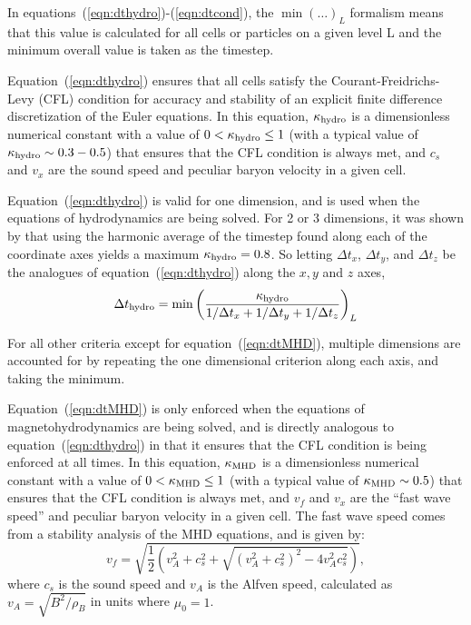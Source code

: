 
In equations~(\ref{eqn:dthydro})-(\ref{eqn:dtcond}), the $\min ( \ldots)_L$ 
formalism means that this value is calculated for all cells or
particles on a given level L and the minimum overall value is taken as the timestep.

Equation~(\ref{eqn:dthydro}) ensures that all cells satisfy the
Courant-Freidrichs-Levy (CFL) condition for accuracy and stability of
an explicit finite difference discretization of the Euler equations.
In this equation, $\kappa_{\rm hydro}$ is a dimensionless
numerical constant with a value of $0 < \kappa_{\rm hydro} \leq 1$
(with a typical value of $\kappa_{\rm hydro} \sim 0.3-0.5$) that
ensures that the CFL condition is always met, and $c_s$ and $v_x$ are
the sound speed and peculiar baryon velocity in a given cell.

Equation~(\ref{eqn:dthydro}) is valid for one dimension, and is used
when the equations of hydrodynamics are being solved.  For 2 or 3
dimensions, it was shown by \cite{Godunov1959}  that using the
harmonic average of the timestep found along each of the coordinate
axes yields a maximum $\kappa_{\rm hydro} = 0.8$.  So letting $\Delta
t_x$, $\Delta t_y$, and $\Delta t_z$ be the analogues of
equation~(\ref{eqn:dthydro}) along the $x,y$ and $z$ axes, 
\begin{equation}
  \Delta t_{\rm hydro} = \min \left( \frac{\kappa_{\rm hydro}} {1/\Delta t_x
  +1/\Delta t_y + 1/\Delta t_z} \right)_L
\end{equation}

For all other criteria except for equation~(\ref{eqn:dtMHD}), multiple dimensions are accounted for by
repeating the one dimensional criterion along each axis, and taking the minimum.

Equation~(\ref{eqn:dtMHD}) is only enforced when the equations of
magnetohydrodynamics are being solved, and is directly analogous to
equation~(\ref{eqn:dthydro}) in that it ensures that the CFL condition
is being enforced at all times.  In this equation, $\kappa_{\rm MHD}$
is a dimensionless
numerical constant with a value of $0 < \kappa_{\rm MHD} \leq 1$ (with a
typical value of $\kappa_{\rm MHD} \sim 0.5$) that ensures that the CFL
condition is always met, and $v_f$ and $v_x$ are the ``fast wave
speed'' and peculiar baryon velocity in a given cell.  The fast wave
speed comes from a stability analysis of the MHD equations, and is
given by:
%
\begin{equation}
v_f = \sqrt{ \frac{1}{2} \left(  v_A^2 + c_s^2 + \sqrt{(v_A^2 +
      c_s^2)^2 - 4 v_A^2 c_s^2}  \right)  },
\label{eqn:vfastmhd}
\end{equation}
%
where $c_s$ is the sound speed and $v_A$ is the Alfven speed, calculated
as $v_A = \sqrt{B^2/\rho_B}$ in units where $\mu_0 = 1$.


